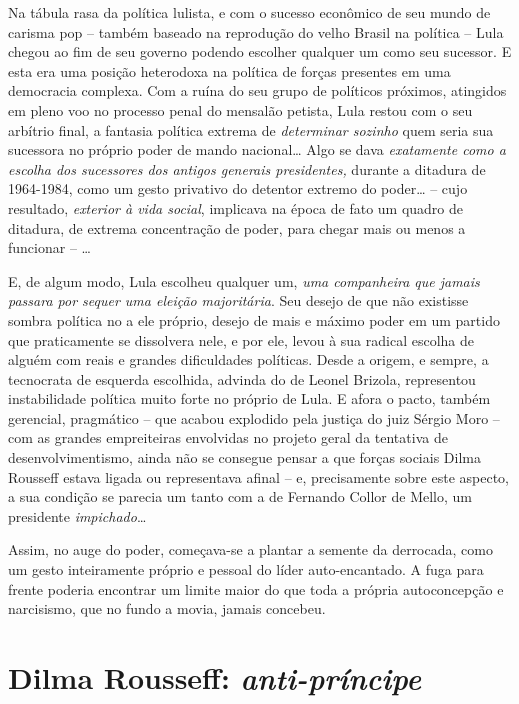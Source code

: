Na tábula rasa da política lulista, e com o sucesso econômico de seu
mundo de carisma pop -- também baseado na reprodução do velho Brasil na
política -- Lula chegou ao fim de seu governo podendo escolher qualquer
um como seu sucessor. E esta era uma posição heterodoxa na política de
forças presentes em uma democracia complexa. Com a ruína do seu grupo de
políticos próximos, atingidos em pleno voo no processo penal do mensalão
petista, Lula restou com o seu arbítrio final, a fantasia política
extrema de \emph{determinar sozinho} quem seria sua sucessora no próprio
poder de mando nacional… Algo se dava \emph{exatamente como a escolha
dos sucessores dos antigos generais presidentes,} durante a ditadura de
1964-1984, como um gesto privativo do detentor extremo do poder… --
cujo resultado, \emph{exterior à vida social}, implicava na época de
fato um quadro de ditadura, de extrema concentração de poder, para
chegar mais ou menos a funcionar -- …

E, de algum modo, Lula escolheu qualquer um, \emph{uma companheira que
jamais passara por sequer uma eleição} \emph{majoritária}. Seu desejo de
que não existisse sombra política no  a ele próprio, desejo de mais e
máximo poder em um partido que praticamente se dissolvera nele, e por
ele, levou à sua radical escolha de alguém com reais e grandes
dificuldades políticas. Desde a origem, e sempre, a tecnocrata de
esquerda escolhida, advinda do  de Leonel Brizola, representou
instabilidade política muito forte no próprio  de Lula. E afora o
pacto, também gerencial, pragmático -- que acabou explodido pela justiça
do juiz Sérgio Moro -- com as grandes empreiteiras envolvidas no projeto
geral da tentativa de desenvolvimentismo, ainda não se consegue pensar a
que forças sociais Dilma Rousseff estava ligada ou representava afinal
-- e, precisamente sobre este aspecto, a sua condição se parecia um
tanto com a de Fernando Collor de Mello, um presidente
\emph{impichado}…

Assim, no auge do poder, começava-se a plantar a semente da derrocada,
como um gesto inteiramente próprio e pessoal do líder auto-encantado. A
fuga para frente poderia encontrar um limite maior do que toda a própria
autoconcepção e narcisismo, que no fundo a movia, jamais concebeu.

  \section{Dilma Rousseff:
  \emph{anti-príncipe}}\label{dilma-rousseff-anti-pruxedncipe}

